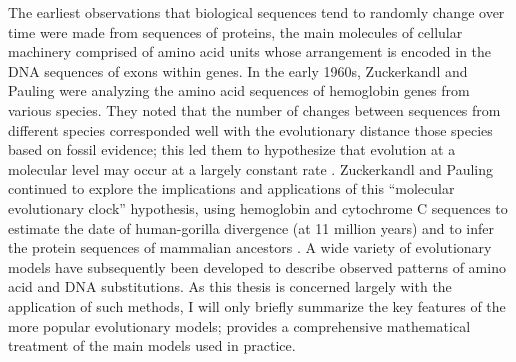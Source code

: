 The earliest observations that biological sequences tend to randomly
change over time were made from sequences of proteins, the main
molecules of cellular machinery comprised of amino acid units whose
arrangement is encoded in the DNA sequences of exons within genes. In
the early 1960s, Zuckerkandl and Pauling were analyzing the amino acid
sequences of hemoglobin genes from various species. They noted that
the number of changes between sequences from different species
corresponded well with the evolutionary distance those species based
on fossil evidence; this led them to hypothesize that evolution at a
molecular level may occur at a largely constant rate
\citep{Zuckerkandl1962,Morgan1998}. Zuckerkandl and Pauling continued
to explore the implications and applications of this ``molecular
evolutionary clock'' hypothesis, using hemoglobin and cytochrome C
sequences to estimate the date of human-gorilla divergence (at 11
million years) and to infer the protein sequences of mammalian
ancestors \citep{Zuckerkandl1965}. A wide variety of evolutionary
models have subsequently been developed to describe observed patterns
of amino acid and DNA substitutions. As this thesis is concerned
largely with the application of such methods, I will only briefly
summarize the key features of the more popular evolutionary models;
\citet{Yang2006} provides a comprehensive mathematical treatment of
the main models used in practice.

